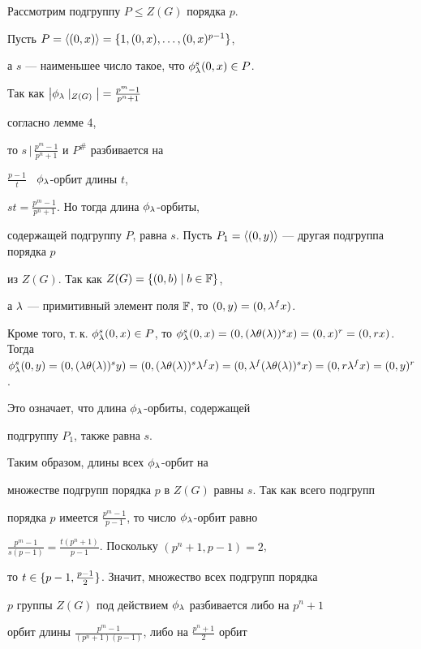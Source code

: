 \begin{pf}


Рассмотрим подгруппу $P\le Z(G)$ порядка $p$.


Пусть $P=\langle(0,x)\rangle=\lbrace1,(0,x),\dotsc,(0,x)^{p-1}\rbrace$,


а $s$ --- наименьшее число такое, что $\phi_\lambda^s(0,x)\in P$.


Так как $\big|\phi_\la\mid_{Z(G)}\big|=


\frac{p^m-1}{p^n+1}$


согласно лемме 4, 


то $s\,\big|\,\frac{p^m-1}{p^n+1}$ и $P^{\#}$ разбивается на


$\frac{p-1}{t}$ \ $\phi_\lambda$-орбит длины $t$,


$st=\frac{p^m-1}{p^n+1}$. Но тогда длина $\phi_\lambda$-орбиты, 


содержащей подгруппу $P$, равна $s$. Пусть $P_1=


\lan(0,y)\ra$ --- другая подгруппа порядка $p$


из $Z(G)$. Так как $Z(G)=\lbrace(0,b)\mid b\in\Bbb F\rbrace$,


а $\lambda$ --- примитивный элемент поля $\Bbb F$, то $(0,y)=(0,\lambda^fx)$.


Кроме того, т.\,к. $\phi_\la^s(0,x)\in P$, то $\phi_\la^s(0,x)=


(0,(\la\te(\la))^sx)=(0,x)^r=(0,rx)$. Тогда $\phi_\la^s(0,y)=


(0,(\la\te(\la))^sy)=(0,(\la\te(\la))^s\la^fx)=(0,\la^f(\la\te(\la))^sx)=


(0,r\la^fx)=(0,y)^r$.


Это означает, что длина $\phi_\lambda$-орбиты, содержащей 


подгруппу $P_1$, также равна $s$.


Таким образом, длины всех $\phi_\lambda$-орбит на 


множестве подгрупп порядка $p$ в $Z(G)$ равны $s$. Так как всего подгрупп 


порядка $p$ имеется $\frac{p^m-1}{p-1}$, то число $\phi_\lambda$-орбит равно


$\frac{p^m-1}{s(p-1)}=\frac{t(p^n+1)}{p-1}$. Поскольку $(p^n+1,p-1)=2$,


то $t\in\lbrace p-1,\frac{p-1}{2}\rbrace$. Значит, множество всех подгрупп порядка 


$p$ группы $Z(G)$ под действием $\phi_\lambda$ разбивается либо на $p^n+1$ 


орбит длины $\frac{p^m-1}{(p^n+1)(p-1)}$, либо на $\frac{p^n+1}{2}$ орбит 



\end{pf}
